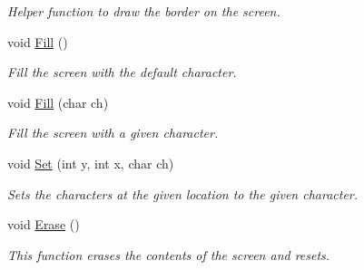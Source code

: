 \begin{DoxyCompactItemize}
\begin{DoxyCompactList}\small\item\em Helper function to draw the border on the screen. \end{DoxyCompactList}\item 
\hypertarget{classScreen_a8cf89892a333f7d6e7227ffdf77b3351}{void \hyperlink{classScreen_a8cf89892a333f7d6e7227ffdf77b3351}{Fill} ()}\label{classScreen_a8cf89892a333f7d6e7227ffdf77b3351}

\begin{DoxyCompactList}\small\item\em Fill the screen with the default character. \end{DoxyCompactList}\item 
\hypertarget{classScreen_aeeebb297b5f39c2b25ee026df8fec9ac}{void \hyperlink{classScreen_aeeebb297b5f39c2b25ee026df8fec9ac}{Fill} (char ch)}\label{classScreen_aeeebb297b5f39c2b25ee026df8fec9ac}

\begin{DoxyCompactList}\small\item\em Fill the screen with a given character. \end{DoxyCompactList}\item 
void \hyperlink{classScreen_ab035671163a5cabee7611c7c456b1c56}{Set} (int y, int x, char ch)
\begin{DoxyCompactList}\small\item\em Sets the characters at the given location to the given character. \end{DoxyCompactList}\item 
\hypertarget{classScreen_a7e2c21a6e63390eb3d8b46ee85af05d2}{void \hyperlink{classScreen_a7e2c21a6e63390eb3d8b46ee85af05d2}{Erase} ()}\label{classScreen_a7e2c21a6e63390eb3d8b46ee85af05d2}

\begin{DoxyCompactList}\small\item\em This function erases the contents of the screen and resets. \end{DoxyCompactList}\end{DoxyCompactItemize}
